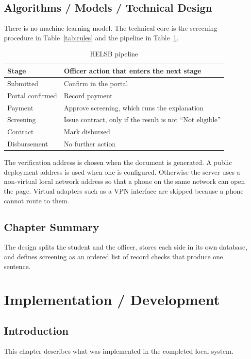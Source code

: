 \documentclass[12pt,a4paper]{report}
\begin{document}
\section{Algorithms / Models / Technical Design}
There is no machine-learning model. The technical core is the screening procedure in Table~\ref{tab:rules} and the pipeline in Table~\ref{tab:pipeline}.

\begin{table}[H]
\centering
\caption{HELSB pipeline}
\label{tab:pipeline}
\begin{tabular}{p{}p{}}
\toprule
Stage & Officer action that enters the next stage\\
\midrule
Submitted & Confirm in the portal\\
Portal confirmed & Record payment\\
Payment & Approve screening, which runs the explanation\\
Screening & Issue contract, only if the result is not ``Not eligible''\\
Contract & Mark disbursed\\
Disbursement & No further action\\
\bottomrule
\end{tabular}
\end{table}

The verification address is chosen when the document is generated. A public deployment address is used when one is configured. Otherwise the server uses a non-virtual local network address so that a phone on the same network can open the page. Virtual adapters such as a VPN interface are skipped because a phone cannot route to them.

\section{Chapter Summary}
The design splits the student and the officer, stores each side in its own database, and defines screening as an ordered list of record checks that produce one sentence.

\chapter{Implementation / Development}

\section{Introduction}
This chapter describes what was implemented in the completed local system.
\end{document}
